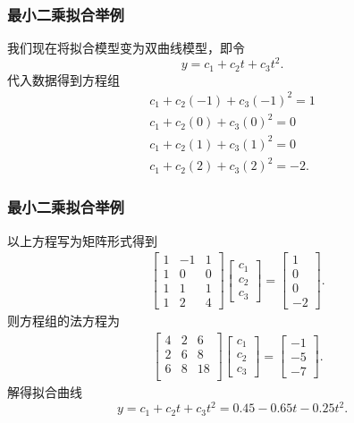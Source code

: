 \documentclass[10pt]{beamer}
\begin{document}
\begin{frame}
\frametitle{最小二乘拟合举例}
我们现在将拟合模型变为双曲线模型，即令
\begin{equation}
y = c_1 + c_2 t + c_3 t^2.
\end{equation}
代入数据得到方程组
\begin{align}
c_1 + c_2 (-1) + c_3 (-1)^2 = 1 \nonumber \\
c_1 + c_2 (0) + c_3(0)^2 = 0 \nonumber \\
c_1 + c_2 (1) + c_3 (1)^2 = 0 \nonumber \\
c_1 + c_2 (2) + c_3 (2)^2 = -2.
\end{align}
\end{frame}


\begin{frame}
\frametitle{最小二乘拟合举例}
以上方程写为矩阵形式得到
\begin{align}
&\left[ \begin{array}{ccc}
     1    & -1 & 1\\
     1    &   0 & 0\\
     1    & 1  & 1\\
     1    & 2  & 4                     
            \end{array} \right] 
\left[ \begin{array}{c} 
      c_1 \\ c_2 \\ c_3 \end{array} \right] 
=
\left[ \begin{array}{c}
      1 \\ 0 \\ 0  \\ -2  \end{array} \right] .
\end{align}
则方程组的法方程为
\begin{align}
&\left[ \begin{array}{ccc}
     4    & 2 & 6\\
     2    &   6 & 8\\
     6    & 8  & 18\\                   
            \end{array} \right] 
\left[ \begin{array}{c} 
      c_1 \\ c_2 \\ c_3 \end{array} \right] 
=
\left[ \begin{array}{c}
      -1 \\ -5 \\ -7   \end{array} \right] .
\end{align}
解得拟合曲线
\begin{equation}
y = c_1 + c_2 t + c_3 t^2 = 0.45 - 0.65t -0.25t^2.
\end{equation} 
\end{frame}
\end{document}

